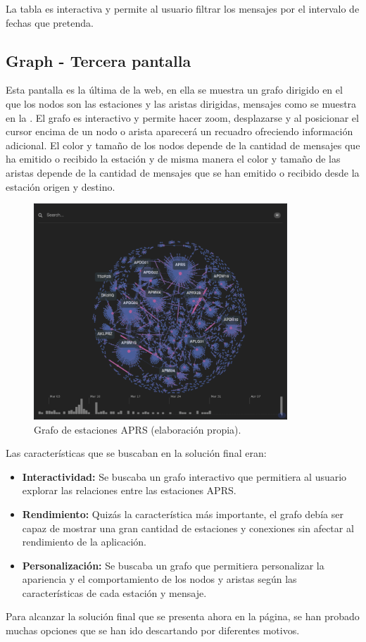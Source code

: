 La tabla es interactiva y permite al usuario filtrar los mensajes por el intervalo de fechas que pretenda.

\subsection{Graph - Tercera pantalla}
Esta pantalla es la última de la web, en ella se muestra un grafo dirigido en el que los nodos son las estaciones y las aristas dirigidas, mensajes como se muestra en la . El grafo es interactivo y permite hacer zoom, desplazarse y al posicionar el cursor encima de un nodo o arista aparecerá un recuadro ofreciendo información adicional. El color y tamaño de los nodos depende de la cantidad de mensajes que ha emitido o recibido la estación y de misma manera el color y tamaño de las aristas depende de la cantidad de mensajes que se han emitido o recibido desde la estación origen y destino.

\begin{figure}[h]
	\centering
	\includegraphics[width=0.85\textwidth]{Imagenes/Chapter_4/graph.png}
	\caption[Grafo de estaciones APRS.]{Grafo de estaciones APRS (elaboración propia).}
	\label{fig:graph}
\end{figure}

Las características que se buscaban en la solución final eran:

\begin{itemize}
	\item \textbf{Interactividad:} Se buscaba un grafo interactivo que permitiera al usuario explorar las relaciones entre las estaciones APRS.
	\item \textbf{Rendimiento:} Quizás la característica más importante, el grafo debía ser capaz de mostrar una gran cantidad de estaciones y conexiones sin afectar al rendimiento de la aplicación.
	\item \textbf{Personalización:} Se buscaba un grafo que permitiera personalizar la apariencia y el comportamiento de los nodos y aristas según las características de cada estación y mensaje.
\end{itemize}
Para alcanzar la solución final que se presenta ahora en la página, se han probado muchas opciones que se han ido descartando por diferentes motivos.
